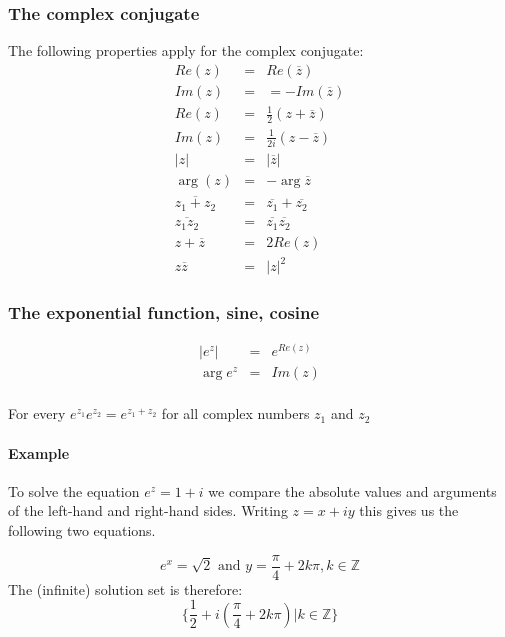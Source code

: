 \documentclass{article}
\begin{document}
			\subsubsection{The complex conjugate}
			The following properties apply for the complex conjugate:
			\begin{eqnarray*}
				Re(z) &=& Re(\overline{z}) \\
				Im(z) &=& = -Im(\overline{z}) \\
				Re(z) &=& \frac{1}{2}(z + \overline{z}) \\
				Im(z) &=& \frac{1}{2i}(z-\overline{z}) \\
				|z| &=& |\overline{z}| \\
				\arg(z) &=& -\arg{\overline{z}} \\
				\overline{z_1 + z_2} &=& \overline{z_1} + \overline{z_2} \\
				\overline{z_1z_2} &=& \overline{z_1}\overline{z_2} \\
				z + \overline{z} &=& 2Re(z) \\
				z\overline{z} &=& |z|^2
			\end{eqnarray*}
		
		\subsubsection{The exponential function, sine, cosine}
			\begin{eqnarray*}
				|e^z| &=& e^{Re(z)} \\
				\arg{e^z} &=& Im(z)\\
			\end{eqnarray*}
		
			For every $e^{z_1}e^{z_2} = e^{z_1+z_2}$ for all complex numbers $z_1$ and $z_2$
		
			\paragraph{Example}
			To solve the equation $e^z = 1+i$ we compare the absolute values and arguments of the left-hand and right-hand sides. Writing $z=x+iy$ this gives us the following two equations.
			
			\begin{equation*}
				e^x = \sqrt{2} \text{ and } y=\frac{\pi}{4} + 2k\pi, k \in \mathbb{Z}
			\end{equation*}
			The (infinite) solution set is therefore:
			\begin{equation*}
				\{\frac{1}{2} + i(\frac{\pi}{4} + 2k\pi) | k \in \mathbb{Z}\}
			\end{equation*}
			
\end{document}
